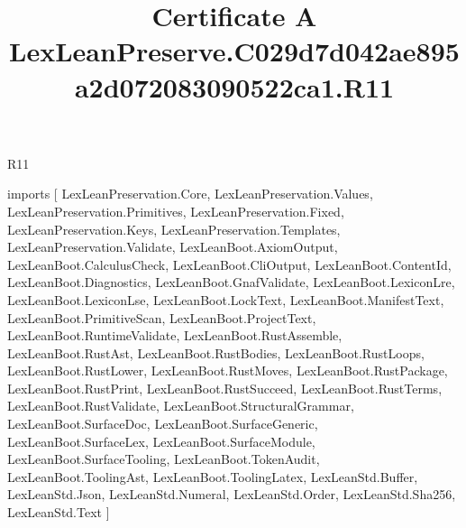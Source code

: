\begin{lexlean}{R11}
\title{Certificate A LexLeanPreserve.C029d7d042ae895a2d072083090522ca1.R11}
\begin{coremodule}
imports [
  LexLeanPreservation.Core,
  LexLeanPreservation.Values,
  LexLeanPreservation.Primitives,
  LexLeanPreservation.Fixed,
  LexLeanPreservation.Keys,
  LexLeanPreservation.Templates,
  LexLeanPreservation.Validate,
  LexLeanBoot.AxiomOutput,
  LexLeanBoot.CalculusCheck,
  LexLeanBoot.CliOutput,
  LexLeanBoot.ContentId,
  LexLeanBoot.Diagnostics,
  LexLeanBoot.GnafValidate,
  LexLeanBoot.LexiconLre,
  LexLeanBoot.LexiconLse,
  LexLeanBoot.LockText,
  LexLeanBoot.ManifestText,
  LexLeanBoot.PrimitiveScan,
  LexLeanBoot.ProjectText,
  LexLeanBoot.RuntimeValidate,
  LexLeanBoot.RustAssemble,
  LexLeanBoot.RustAst,
  LexLeanBoot.RustBodies,
  LexLeanBoot.RustLoops,
  LexLeanBoot.RustLower,
  LexLeanBoot.RustMoves,
  LexLeanBoot.RustPackage,
  LexLeanBoot.RustPrint,
  LexLeanBoot.RustSucceed,
  LexLeanBoot.RustTerms,
  LexLeanBoot.RustValidate,
  LexLeanBoot.StructuralGrammar,
  LexLeanBoot.SurfaceDoc,
  LexLeanBoot.SurfaceGeneric,
  LexLeanBoot.SurfaceLex,
  LexLeanBoot.SurfaceModule,
  LexLeanBoot.SurfaceTooling,
  LexLeanBoot.TokenAudit,
  LexLeanBoot.ToolingAst,
  LexLeanBoot.ToolingLatex,
  LexLeanStd.Buffer,
  LexLeanStd.Json,
  LexLeanStd.Numeral,
  LexLeanStd.Order,
  LexLeanStd.Sha256,
  LexLeanStd.Text
]


\end{coremodule}
\end{lexlean}
